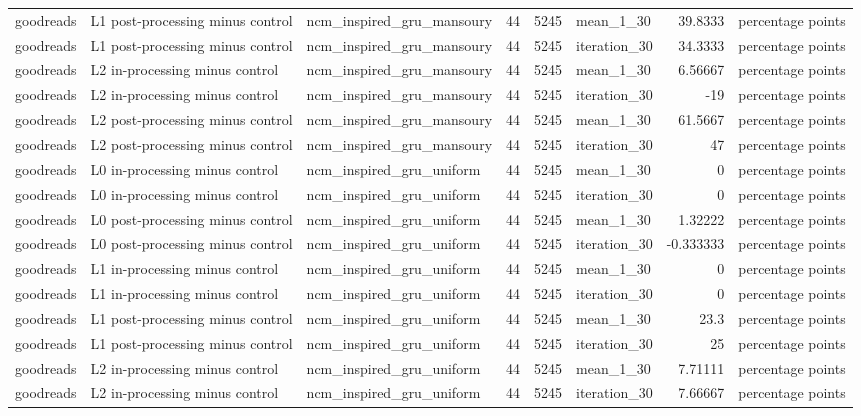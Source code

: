 \begin{table}[htbp!]
\begin{tabular}{lllrrlrl}
goodreads & L1 post-processing minus control & ncm\_inspired\_gru\_mansoury & 44 & 5245 & mean\_1\_30 & 39.8333 & percentage points \\
goodreads & L1 post-processing minus control & ncm\_inspired\_gru\_mansoury & 44 & 5245 & iteration\_30 & 34.3333 & percentage points \\
goodreads & L2 in-processing minus control & ncm\_inspired\_gru\_mansoury & 44 & 5245 & mean\_1\_30 & 6.56667 & percentage points \\
goodreads & L2 in-processing minus control & ncm\_inspired\_gru\_mansoury & 44 & 5245 & iteration\_30 & -19 & percentage points \\
goodreads & L2 post-processing minus control & ncm\_inspired\_gru\_mansoury & 44 & 5245 & mean\_1\_30 & 61.5667 & percentage points \\
goodreads & L2 post-processing minus control & ncm\_inspired\_gru\_mansoury & 44 & 5245 & iteration\_30 & 47 & percentage points \\
goodreads & L0 in-processing minus control & ncm\_inspired\_gru\_uniform & 44 & 5245 & mean\_1\_30 & 0 & percentage points \\
goodreads & L0 in-processing minus control & ncm\_inspired\_gru\_uniform & 44 & 5245 & iteration\_30 & 0 & percentage points \\
goodreads & L0 post-processing minus control & ncm\_inspired\_gru\_uniform & 44 & 5245 & mean\_1\_30 & 1.32222 & percentage points \\
goodreads & L0 post-processing minus control & ncm\_inspired\_gru\_uniform & 44 & 5245 & iteration\_30 & -0.333333 & percentage points \\
goodreads & L1 in-processing minus control & ncm\_inspired\_gru\_uniform & 44 & 5245 & mean\_1\_30 & 0 & percentage points \\
goodreads & L1 in-processing minus control & ncm\_inspired\_gru\_uniform & 44 & 5245 & iteration\_30 & 0 & percentage points \\
goodreads & L1 post-processing minus control & ncm\_inspired\_gru\_uniform & 44 & 5245 & mean\_1\_30 & 23.3 & percentage points \\
goodreads & L1 post-processing minus control & ncm\_inspired\_gru\_uniform & 44 & 5245 & iteration\_30 & 25 & percentage points \\
goodreads & L2 in-processing minus control & ncm\_inspired\_gru\_uniform & 44 & 5245 & mean\_1\_30 & 7.71111 & percentage points \\
goodreads & L2 in-processing minus control & ncm\_inspired\_gru\_uniform & 44 & 5245 & iteration\_30 & 7.66667 & percentage points \\

\end{tabular}
\end{table}
